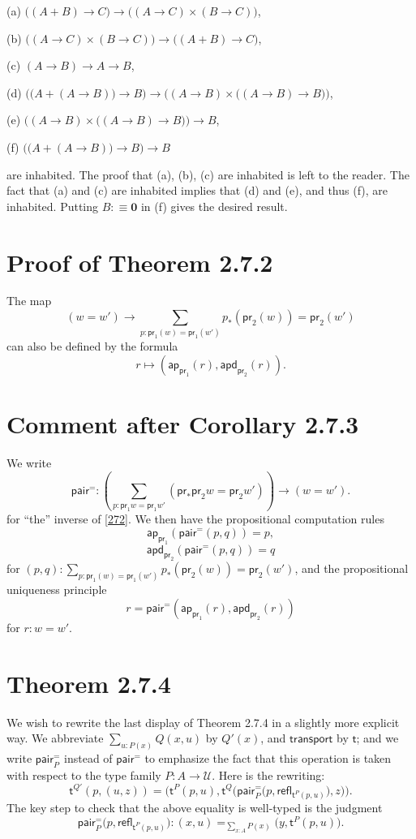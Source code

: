 \documentclass[12pt]{article}
\newcommand{\mbf}{\mathbf}
\newcommand{\msf}{\mathsf}
\newcommand{\ap}{\mathsf{ap}}
\newcommand{\apd}{\mathsf{apd}}
\newcommand{\nn}{\noindent}
\newcommand{\pa}{\mathsf{pair}^=}
\newcommand{\pr}{\mathsf{pr}}
\newcommand{\refl}{\mathsf{refl}}
\newcommand{\tr}{\mathsf{transport}}
\newcommand{\U}{\mathcal U}
\begin{document}
(a) $\big((A+B)\to C\big)\to\big((A\to C)\times(B\to C)\big)$,

(b) $\big((A\to C)\times(B\to C)\big)\to\big((A+B)\to C\big)$,

(c) $(A\to B)\to A\to B$,

(d) $\Big(\big(A+(A\to B)\big)\to B\Big)\to\Big((A\to B)\times\big((A\to B)\to B\big)\Big)$, 

(e) $\Big((A\to B)\times\big((A\to B)\to B\big)\Big)\to B$,

(f) $\Big(\big(A+(A\to B)\big)\to B\Big)\to B$

\nn are inhabited. The proof that (a), (b), (c) are inhabited is left to the reader. The fact that (a) and (c) are inhabited implies that (d) and (e), and thus (f), are inhabited. Putting $B:\equiv\mbf0$ in (f) gives the desired result.


\section{Proof of Theorem 2.7.2}

The map 
\begin{equation}\label{272}
(w=w')\to\sum_{p:\pr_1(w)=\pr_1(w')}p_*(\pr_2(w))=\pr_2(w')
\end{equation}
can also be defined by the formula 
$$
r\mapsto(\ap_{\pr_1}(r),\apd_{\pr_2}(r)).
$$


\section{Comment after Corollary 2.7.3}

We write 
$$
\pa:\left(\sum_{p:\pr_1w=\pr_1w'}(\pr_*\pr_2w=\pr_2w')\right)\to(w=w').
$$ 
for ``the'' inverse of \eqref{272}. We then have the propositional computation rules 
$$
\ap_{\pr_1}(\pa(p,q))=p,
$$
$$
\apd_{\pr_2}(\pa(p,q))=q
$$
for $(p,q):\sum_{p:\pr_1(w)=\pr_1(w')}p_*(\pr_2(w))=\pr_2(w')$, and the propositional uniqueness principle 
$$
r=\pa(\ap_{\pr_1}(r),\apd_{\pr_2}(r))
$$ 
for $r:w=w'$.


\section{Theorem 2.7.4}\label{274}

We wish to rewrite the last display of Theorem 2.7.4 in a slightly more explicit way. We abbreviate $\sum_{u:P(x)}Q(x,u)$ by $Q'(x)$, and $\tr$ by $\msf t$; and we write $\pa_P$ instead of $\pa$ to emphasize the fact that this operation is taken with respect to the type family $P:A\to\U$. Here is the rewriting:
$$
\msf t^{Q'}(p,(u,z))=\Bigg(\msf t^P(p,u),\msf t^Q\bigg(\pa_P\Big(p,\refl_{\msf t^P(p,u)}\Big),z\bigg)\Bigg).
$$ 
The key step to check that the above equality is well-typed is the judgment  
$$
\pa_P\Big(p,\refl_{\msf t^P(p,u)}\Big):(x,u)=_{\sum_{x:A}P(x)}\big(y,\msf t^P(p,u)\big).
$$
\end{document}
